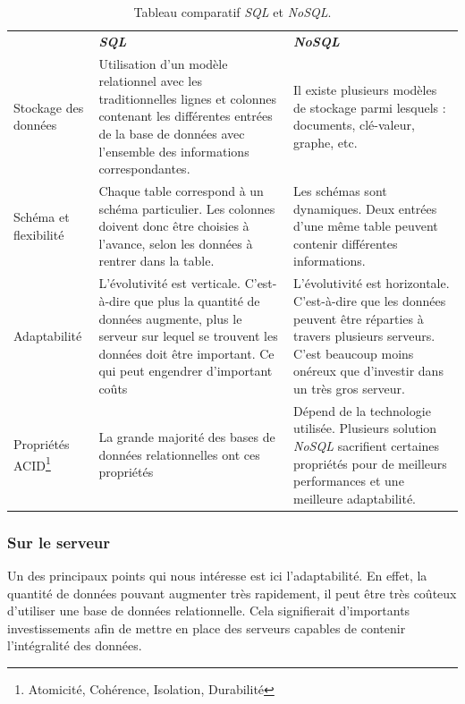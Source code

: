\documentclass[a4paper,10pt, twoside]{report}
\begin{document}
\begin{spacing}{1.2}
\begin{savenotes}
\begin{table}[h!]
  \def\arraystretch{1.5}
  \setlength{\fboxsep}{13pt} %
  \setlength{\fboxrule}{0pt} %
  \begin{tabular}{lm{6cm}m{6cm}}
   \rowcolor{arkred} 
    \arrayrulecolor{gray73}\hline
    & \color{white} \textbf{\textit{SQL}} &
    \color{white} \textbf{\textit{NoSQL}}\\
    Stockage des données & Utilisation d'un modèle relationnel avec les
    traditionnelles lignes et colonnes contenant les différentes entrées de
    la base de données avec l'ensemble des informations correspondantes. &
    Il existe plusieurs modèles de stockage parmi lesquels : documents,
    clé-valeur, graphe, etc.\\
    \hline
    Schéma et flexibilité & Chaque table correspond à un schéma
    particulier. Les colonnes doivent donc être choisies à l'avance, selon
    les données à rentrer dans la table. & Les schémas sont dynamiques.
    Deux entrées d'une même table peuvent contenir différentes
    informations.\\
    \hline
    Adaptabilité & L'évolutivité est verticale. C'est-à-dire que plus
    la quantité de données augmente, plus le serveur sur lequel se trouvent
    les données doit être important. Ce qui peut engendrer d'important
    coûts & L'évolutivité est horizontale. C'est-à-dire que les
    données peuvent être réparties à travers plusieurs serveurs. C'est beaucoup
    moins onéreux que d'investir dans un très gros serveur.\\
    \hline
    Propriétés ACID\footnote{Atomicité, Cohérence, Isolation,
    Durabilité} & La grande majorité des bases de données relationnelles
    ont ces propriétés & Dépend de la technologie utilisée. Plusieurs
    solution \textit{NoSQL} sacrifient certaines propriétés pour de meilleurs
    performances et une meilleure adaptabilité.\\
  \end{tabular}
  \caption{\label{tabSQLNoSQL} Tableau comparatif \textit{SQL} et
  \textit{NoSQL}.}
\end{table}
\end{savenotes}


\subsubsection{Sur le serveur}

Un des principaux points qui nous intéresse est ici l'adaptabilité. En
effet, la quantité de données pouvant augmenter très rapidement, il peut
être très coûteux d'utiliser une base de données relationnelle. Cela
signifierait d'importants investissements afin de mettre en place des serveurs
capables de contenir l'intégralité des données.


\end{spacing}
\end{document}
